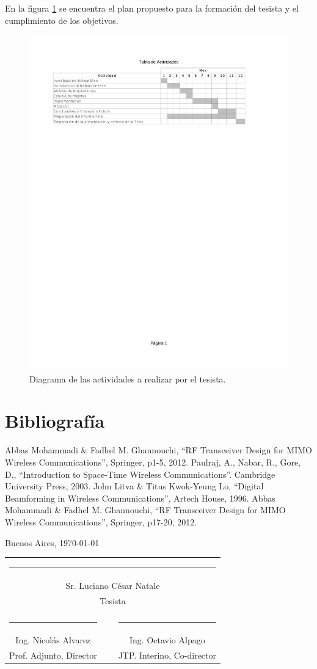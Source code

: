 \documentclass[a4paper]{article}
\newcommand{\signature}[7]{
	\vfill

	\begin{flushright}
		#1, \today
	\end{flushright}
	\vspace{3cm}

	\noindent
	\centering
	\begin{tabularx}{0.9\textwidth}{cXc}
		\multicolumn{3}{c}{\rule{5cm}{1pt}}\\
		\multicolumn{3}{c}{#2}\\
		\multicolumn{3}{c}{#3}\\
		\vspace{3cm}\\
		\rule{5cm}{1pt} & \hspace{2.5cm} & \rule{5cm}{1pt} \\
		#4 & ~ & #5 \\
		#6 & ~ & #7
	\end{tabularx}
	\vspace{1cm}
}
\begin{document}
En la figura \ref{TablaActividades} se encuentra el plan propuesto para la formación del tesista y el cumplimiento de los objetivos.

\begin{figure}[h!]
	\label{TablaActividades}
	\includegraphics[trim = 20mm 200mm 20mm 25mm, clip, width=\textwidth]{tabla_actividades}
	\caption{Diagrama de las actividades a realizar por el tesista.}
\end{figure}

\newpage

\section{Bibliografía}

\begin{thebibliography}{99}

 Abbas Mohammadi \& Fadhel M. Ghannouchi, ``RF Transceiver Design for MIMO Wireless Communications'', Springer, p1-5, 2012.
 Paulraj, A., Nabar, R., Gore, D., ``Introduction to Space-Time Wireless Communications''. Cambridge University Press, 2003.
 John Litva \& Titus Kwok-Yeung Lo, ``Digital Beamforming in Wireless Communications'', Artech House, 1996.
 Abbas Mohammadi \& Fadhel M. Ghannouchi, ``RF Transceiver Design for MIMO Wireless Communications'', Springer, p17-20, 2012.
\end{thebibliography}

\newpage

\signature{Buenos Aires}{Sr. Luciano César Natale}{Tesista}{Ing. Nicolás Alvarez}{Ing. Octavio Alpago}{Prof. Adjunto, Director}{JTP. Interino, Co-director}
\end{document}
